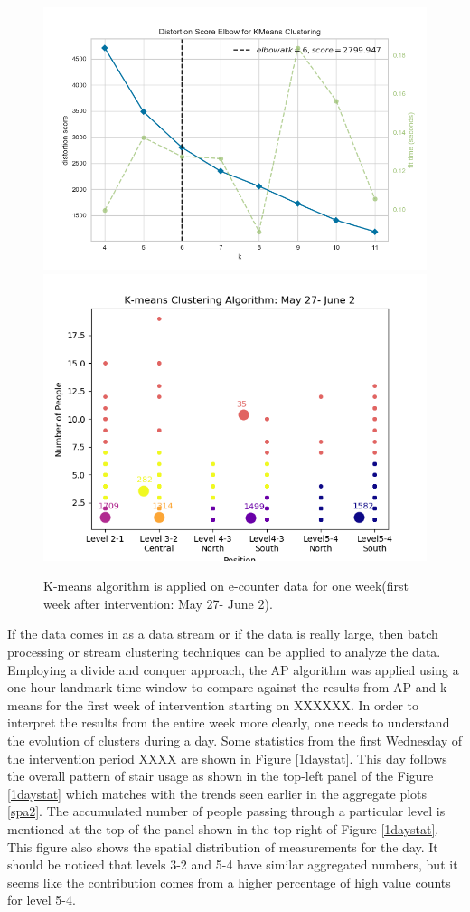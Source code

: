 \documentclass[../UNBThesis2.tex]{subfiles}
\begin{document}
\begin{figure}[!h]
    \centering
    \includegraphics[width=.49\textwidth]{image/Chapters/Chapter6/elbowAfterInt.png}
    \includegraphics[width=.49\textwidth]{image/Chapters/Chapter6/kmeans1WeekAfter.png}
    \caption{K-means algorithm is applied on e-counter data for one week(first week after intervention: May 27- June 2).}
    \label{elbkmean}
\end{figure}   


    
If the data comes in as a data stream or if the data is really large, then batch processing or stream clustering techniques can be applied to analyze the data. Employing a divide and conquer approach, the AP algorithm was applied using a one-hour landmark time window to compare against the results from AP and k-means for the first week of intervention starting on XXXXXX. In order to interpret the results from the entire week more clearly, one needs to understand the evolution of clusters during a day. Some statistics from the first Wednesday of the intervention period XXXX are shown in Figure \ref{1daystat}. This day follows the overall pattern of stair usage as shown in the top-left panel of the Figure \ref{1daystat} which matches with the trends seen earlier in the aggregate plots \ref{spa2}. The accumulated number of people passing through a particular level is mentioned at the top of the panel shown in the top right of Figure \ref{1daystat}. This figure also shows the spatial distribution of measurements for the day. It should be noticed that levels 3-2 and 5-4 have similar aggregated numbers, but it seems like the contribution comes from a higher percentage of high value counts for level 5-4.
\end{document}
